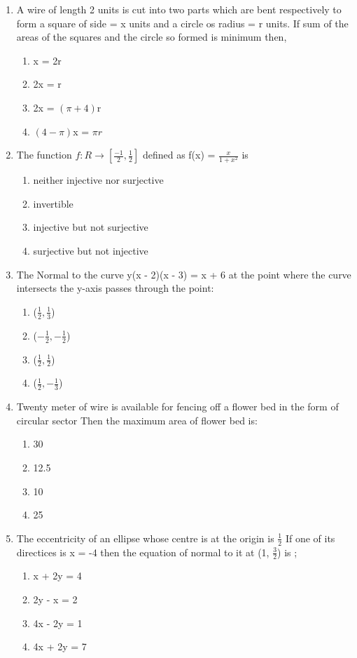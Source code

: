 \begin{enumerate}[label=\arabic*.,ref=\thesubsection.\theenumi]
\item A wire of length 2 units is cut into two parts which are bent respectively to form a square of side = x units and a circle os radius = r units. If sum of the areas of the squares and the circle so formed is minimum then,
\begin{enumerate}
\item x = 2r
\item 2x = r
\item 2x = $(\pi + 4)$r
\item $(4 - \pi)$x = $\pi r$
\end{enumerate}

\item The function $f: R \to [\frac{-1}{2}, \frac{1}{2}]$ defined as f(x) = $\frac{x}{1 + x^2}$ is
\begin{enumerate}
\item neither injective nor surjective 
\item invertible
\item injective but not surjective 
\item surjective but not injective
\end{enumerate}

\item The Normal to the curve y(x - 2)(x - 3) = x + 6 at the point where the curve intersects the y-axis passes through the point:
\begin{enumerate}
\item ($\frac{1}{2}, \frac{1}{3}$)
\item ($-\frac{1}{2}, -\frac{1}{2}$)
\item ($\frac{1}{2}, \frac{1}{2}$)
\item ($\frac{1}{2}, -\frac{1}{3}$)
\end{enumerate}

\item Twenty meter of wire is available for fencing off a flower bed in the form of circular sector Then the maximum area of flower bed is:
\begin{enumerate}
\item 30
\item 12.5
\item 10
\item 25
\end{enumerate}

\item The eccentricity of an ellipse whose centre is at the origin is $\frac{1}{2}$ If one of its directices is x = -4 then the equation of normal to it at (1, $\frac{3}{2}$) is ;
\begin{enumerate}
\item x + 2y = 4
\item 2y - x = 2
\item 4x - 2y = 1
\item 4x + 2y = 7
\end{enumerate}


\end{enumerate}
